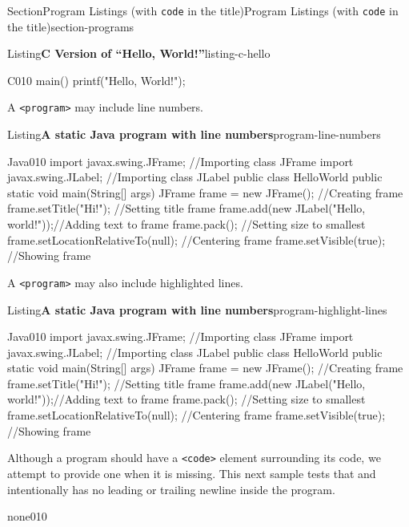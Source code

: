 \documentclass[twoside,10pt,]{article}
\newcommand{\mono}[1]{\texttt{#1}}
\numberwithin{equation}{section}
\begin{document}
\begin{sectionptx}{Section}{Program Listings (with \mono{code} in the title)}{}{Program Listings (with \mono{code} in the title)}{}{}{section-programs}
\begin{listingptx}{Listing}{\textbf{C Version of ``Hello, World!''}}{listing-c-hello}{}
\begin{program}{C}{0}{1}{0}
main()
{
    printf("Hello, World!");
}
\end{program}
\end{listingptx}%
A \mono{<program>} may include line numbers.%
\begin{listingptx}{Listing}{\textbf{A static Java program with line numbers}}{program-line-numbers}{}%
\begin{programnumbered}{Java}{0}{1}{0}
import javax.swing.JFrame;  //Importing class JFrame
import javax.swing.JLabel;  //Importing class JLabel
public class HelloWorld {
    public static void main(String[] args) {
        JFrame frame = new JFrame();           //Creating frame
        frame.setTitle("Hi!");                 //Setting title frame
        frame.add(new JLabel("Hello, world!"));//Adding text to frame
        frame.pack();                          //Setting size to smallest
        frame.setLocationRelativeTo(null);     //Centering frame
        frame.setVisible(true);                //Showing frame
    }
}
\end{programnumbered}
\end{listingptx}%
A \mono{<program>} may also include highlighted lines.%
\begin{listingptx}{Listing}{\textbf{A static Java program with line numbers}}{program-highlight-lines}{}%
\begin{programnumbered}{Java}{0}{1}{0}
import javax.swing.JFrame;  //Importing class JFrame
import javax.swing.JLabel;  //Importing class JLabel
public class HelloWorld {
    public static void main(String[] args) {
        JFrame frame = new JFrame();           //Creating frame
        frame.setTitle("Hi!");                 //Setting title frame
        frame.add(new JLabel("Hello, world!"));//Adding text to frame
        frame.pack();                          //Setting size to smallest
        frame.setLocationRelativeTo(null);     //Centering frame
        frame.setVisible(true);                //Showing frame
    }
}
\end{programnumbered}
\end{listingptx}%
Although a program should have a \mono{<code>} element surrounding its code, we attempt to provide one when it is missing. This next sample tests that and intentionally has no leading or trailing newline inside the program.%
\begin{program}{none}{0}{1}{0}


\end{program}
\end{sectionptx}
\end{document}
